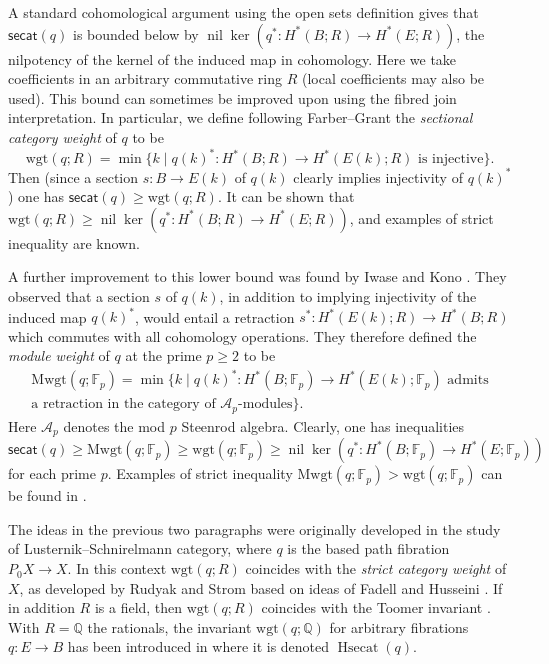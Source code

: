 \documentclass{amsart}
\theoremstyle{plain}
\theoremstyle{definition}
\def\secat{\mathsf{secat}}
\def\wgt{\mathrm{wgt}}
\def\ker{\operatorname{ker}}
\newcommand{\Q}{\mathbb{Q}}
\newcommand{\F}{\mathbb{F}}
\def\Mwgt{\mathrm{Mwgt}}
\begin{document}
A standard cohomological argument using the open sets definition gives that $\secat(q)$ is bounded below by $\operatorname{nil}\ker (q^*:H^*(B;R)\to H^*(E;R))$, the nilpotency of the kernel of the induced map in cohomology. Here we take coefficients in an arbitrary commutative ring $R$ (local coefficients may also be used). This bound can sometimes be improved upon using the fibred join interpretation. In particular, we define following Farber--Grant \cite{FG07,FG08} the \emph{sectional category weight} of $q$ to be 
\[
\wgt(q;R)=\min \{k \mid q(k)^*:H^*(B;R)\to H^*(E(k);R)\mbox{ is injective}\}.
\]
Then (since a section $s:B\to E(k)$ of $q(k)$ clearly implies injectivity of $q(k)^*$) one has $\secat(q)\geq\wgt(q;R)$. It can be shown that $\wgt(q;R)\geq \operatorname{nil}\ker (q^*:H^*(B;R)\to H^*(E;R))$, and examples of strict inequality are known.

A further improvement to this lower bound was found by Iwase and Kono \cite{IwaseKono}. They observed that a section $s$ of $q(k)$, in addition to implying injectivity of the induced map $q(k)^*$, would entail a retraction $s^*: H^*(E(k);R)\to H^*(B;R)$ which commutes with all cohomology operations. They therefore defined the \emph{module weight} of $q$ at the prime $p\ge2$ to be
\begin{multline*}
\Mwgt(q;\F_p)=\min \{k \mid q(k)^*:H^*(B;\F_p)\to H^*(E(k);\F_p)\mbox{ admits}\\
\mbox{a retraction in the category of $\mathcal{A}_p$-modules}\}.
\end{multline*}  
Here $\mathcal{A}_p$ denotes the mod $p$ Steenrod algebra. Clearly, one has inequalities
\[
\secat(q)\ge \Mwgt(q;\F_p) \ge \wgt(q;\F_p)\ge \operatorname{nil}\ker(q^*: H^*(B;\F_p)\to H^*(E;\F_p))
\]
for each prime $p$. Examples of strict inequality $\Mwgt(q;\F_p) > \wgt(q;\F_p)$ can be found in \cite{IwaseKono, Choi09, Choi15}.

The ideas in the previous two paragraphs were originally developed in the study of Lusternik--Schnirelmann category, where $q$ is the based path fibration $P_0 X\to X$. In this context $\wgt(q;R)$ coincides with the \emph{strict category weight} of $X$, as developed by Rudyak \cite{Rudyak99} and Strom \cite{Strom} based on ideas of Fadell and Husseini \cite{FH}. If in addition $R$ is a field, then $\wgt(q;R)$ coincides with the Toomer invariant \cite{Toomer}. With $R=\Q$ the rationals, the invariant $\wgt(q;\Q)$ for arbitrary fibrations $q: E\to B$ has been introduced in \cite{C-VKV} where it is denoted $\operatorname{Hsecat}(q)$. 
\end{document}
